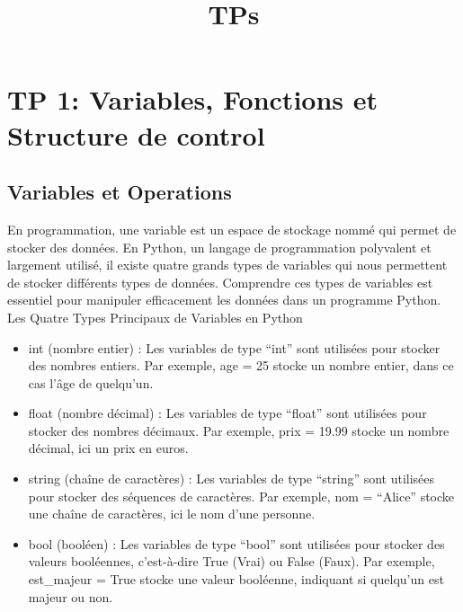 \documentclass[11pt]{article}
\title{TPs}
\begin{document}
    
    \maketitle
    
    

    
    \hypertarget{tp-1-variables-fonctions-et-structure-de-control}{%
\section{TP 1: Variables, Fonctions et Structure de
control}\label{tp-1-variables-fonctions-et-structure-de-control}}

\hypertarget{variables-et-operations}{%
\subsection{Variables et Operations}\label{variables-et-operations}}

    En programmation, une variable est un espace de stockage nommé qui
permet de stocker des données. En Python, un langage de programmation
polyvalent et largement utilisé, il existe quatre grands types de
variables qui nous permettent de stocker différents types de données.
Comprendre ces types de variables est essentiel pour manipuler
efficacement les données dans un programme Python. Les Quatre Types
Principaux de Variables en Python

\begin{itemize}
\item
  int (nombre entier) : Les variables de type ``int'' sont utilisées
  pour stocker des nombres entiers. Par exemple, age = 25 stocke un
  nombre entier, dans ce cas l'âge de quelqu'un.
\item
  float (nombre décimal) : Les variables de type ``float'' sont
  utilisées pour stocker des nombres décimaux. Par exemple, prix = 19.99
  stocke un nombre décimal, ici un prix en euros.
\item
  string (chaîne de caractères) : Les variables de type ``string'' sont
  utilisées pour stocker des séquences de caractères. Par exemple, nom =
  ``Alice'' stocke une chaîne de caractères, ici le nom d'une personne.
\item
  bool (booléen) : Les variables de type ``bool'' sont utilisées pour
  stocker des valeurs booléennes, c'est-à-dire True (Vrai) ou False
  (Faux). Par exemple, est\_majeur = True stocke une valeur booléenne,
  indiquant si quelqu'un est majeur ou non.
\end{itemize}
\end{document}
